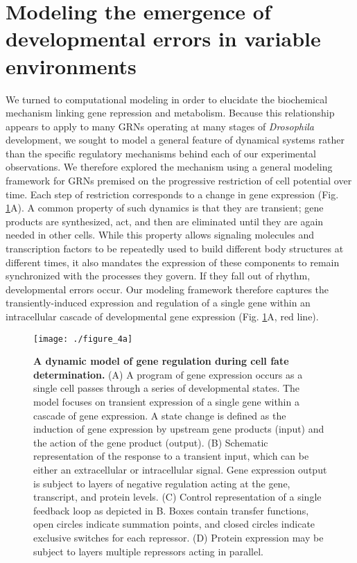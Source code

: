 \section{Modeling the emergence of developmental errors in variable environments}

We turned to computational modeling in order to elucidate the biochemical mechanism linking gene repression and metabolism. Because this relationship appears to apply to many GRNs operating at many stages of \textit{Drosophila} development, we sought to model a general feature of dynamical systems rather than the specific regulatory mechanisms behind each of our experimental observations. We therefore explored the mechanism using a general modeling framework for GRNs premised on the progressive restriction of cell potential over time. Each step of restriction corresponds to a change in gene expression (Fig. \ref{fig:metabolism:fig4a}A). A common property of such dynamics is that they are transient; gene products are synthesized, act, and then are eliminated until they are again needed in other cells. While this property allows signaling molecules and transcription factors to be repeatedly used to build different body structures at different times, it also mandates the expression of these components to remain synchronized with the processes they govern. If they fall out of rhythm, developmental errors occur. Our modeling framework therefore captures the transiently-induced expression and regulation of a single gene within an intracellular cascade of developmental gene expression (Fig. \ref{fig:metabolism:fig4a}A, red line).

\begin{figure}[h!]
\centering
\texttt{[image: ./figure\_4a]}
\caption[A dynamic model of gene regulation during cell fate determination.]{\textbf{A dynamic model of gene regulation during cell fate determination.} (A) A program of gene expression occurs as a single cell passes through a series of developmental states. The model focuses on transient expression of a single gene within a cascade of gene expression. A state change is defined as the induction of gene expression by upstream gene products (input) and the action of the gene product (output). (B) Schematic representation of the response to a transient input, which can be either an extracellular or intracellular signal. Gene expression output is subject to layers of negative regulation acting at the gene, transcript, and protein levels. (C) Control representation of a single feedback loop as depicted in B. Boxes contain transfer functions, open circles indicate summation points, and closed circles indicate exclusive switches for each repressor. (D) Protein expression may be subject to layers multiple repressors acting in parallel.}
\label{fig:metabolism:fig4a}
\end{figure}

